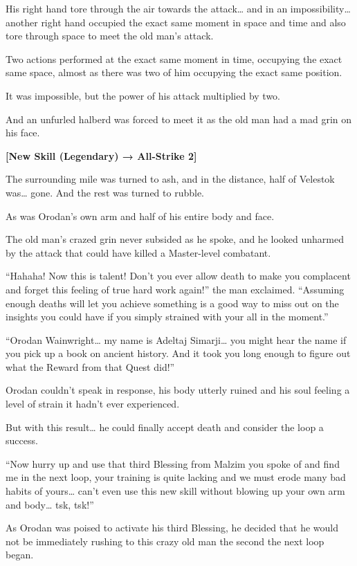 \documentclass[a4paper,10pt]{book}
\begin{document}
His right hand tore through the air towards the attack… and in an impossibility… another right hand occupied the exact same moment in space and time and also tore through space to meet the old man’s attack.\par
Two actions performed at the exact same moment in time, occupying the exact same space, almost as there was two of him occupying the exact same position.\par
It was impossible, but the power of his attack multiplied by two.\par
And an unfurled halberd was forced to meet it as the old man had a mad grin on his face.\par
\textbf{[New Skill (Legendary) → All-Strike 2]}\par
The surrounding mile was turned to ash, and in the distance, half of Velestok was… gone. And the rest was turned to rubble.\par
As was Orodan’s own arm and half of his entire body and face.\par
The old man’s crazed grin never subsided as he spoke, and he looked unharmed by the attack that could have killed a Master-level combatant.\par
“Hahaha! Now this is talent! Don’t you ever allow death to make you complacent and forget this feeling of true hard work again!” the man exclaimed. “Assuming enough deaths will let you achieve something is a good way to miss out on the insights you could have if you simply strained with your all in the moment.”\par
“Orodan Wainwright… my name is Adeltaj Simarji… you might hear the name if you pick up a book on ancient history. And it took you long enough to figure out what the Reward from that Quest did!”\par
Orodan couldn’t speak in response, his body utterly ruined and his soul feeling a level of strain it hadn’t ever experienced.\par
But with this result… he could finally accept death and consider the loop a success.\par
“Now hurry up and use that third Blessing from Malzim you spoke of and find me in the next loop, your training is quite lacking and we must erode many bad habits of yours… can’t even use this new skill without blowing up your own arm and body… tsk, tsk!”\par
As Orodan was poised to activate his third Blessing, he decided that he would not be immediately rushing to this crazy old man the second the next loop began.\par
\end{document}
